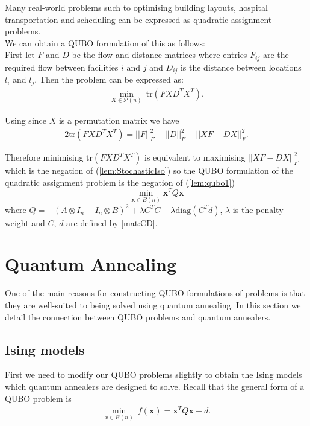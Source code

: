 \documentclass{article}
\begin{document}
\noindent Many real-world problems such to optimising building layouts, hospital transportation and scheduling can be expressed as quadratic assignment problems.\\

\noindent We can obtain a QUBO formulation of this as follows: \\
First let \(F\) and \(D\) be the flow and distance matrices where entries \(F_{ij}\) are the required flow between facilities \(i\) and \(j\) and \(D_{ij}\) is the distance between locations \(l_i\) and \(l_j\). Then the problem can be expressed as:
\begin{align*}
    \min_{X \in \mathcal{P}(n)} \: \text{tr}(FXD^TX^T).
\end{align*}

\noindent Using \cite[p.~3]{klus2023continuous} since \(X\) is a permutation matrix we have
\begin{align*}
    2\text{tr}(FXD^TX^T) = ||F||_F^2 + ||D||_F^2 - ||XF - DX||_F^2.
\end{align*}

\noindent Therefore minimising \(\text{tr}(FXD^TX^T)\) is equivalent to maximising \(||XF - DX||_F^2\) which is the negation of (\ref{lem:StochasticIso}) so the QUBO formulation of the quadratic assignment problem is the negation of (\ref{lem:qubo1})
\begin{equation*}
	\min_{\mathbf{x} \in B(n)} \mathbf{x}^T Q \mathbf{x}
\end{equation*}
where \(Q = -(A \otimes I_n - I_n \otimes B)^2 + \lambda C^T C -\lambda\text{diag}(C^T d)\), \(\lambda\) is the penalty weight and \(C\), \(d\) are defined by \ref{mat:CD}.\\

\section{Quantum Annealing}

One of the main reasons for constructing QUBO formulations of problems is that they are well-suited to being solved using quantum annealing. In this section we detail the connection between QUBO problems and quantum annealers. 

\subsection{Ising models}

First we need to modify our QUBO problems slightly to obtain the Ising models which quantum annealers are designed to solve.
Recall that the general form of a QUBO problem is
\begin{align*}
    \min_{x \in B(n)} \: f(\mathbf{x}) = \mathbf{x}^T Q \mathbf{x} + d.
\end{align*}
\end{document}

